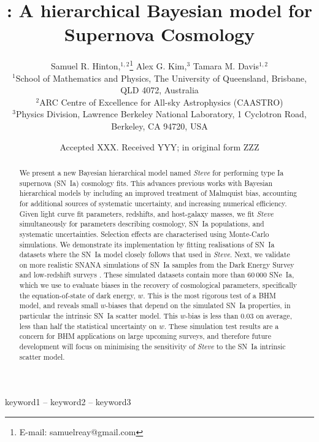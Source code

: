 \documentclass[a4paper,fleqn,usenatbib]{mnras}
\title[\name]{\name: A hierarchical Bayesian model for Supernova Cosmology}
\author[S. R. Hinton et al.]{
	Samuel R. Hinton,$^{1,2}$\thanks{E-mail: samuelreay@gmail.com}
	Alex G. Kim,$^{3}$
	Tamara M. Davis$^{1,2}$
	\\
	$^{1}$School of Mathematics and Physics, The University of Queensland, Brisbane, QLD 4072, Australia\\
	$^{2}$ARC Centre of Excellence for All-sky Astrophysics (CAASTRO)\\
	$^{3}$Physics Division, Lawrence Berkeley National Laboratory, 1 Cyclotron Road, Berkeley, CA 94720, USA
}
\date{Accepted XXX. Received YYY; in original form ZZZ}
\newcommand{\green}{\color{forestgreen}}
\newcommand{\steve}{\textit{Steve}}
\begin{document}
\label{firstpage}
\pagerange{\pageref{firstpage}--\pageref{lastpage}}
\maketitle






\begin{abstract}
We present a new Bayesian hierarchical model named {\steve} for performing type Ia supernova (SN~Ia) cosmology fits. 
%
This advances previous works with Bayesian hierarchical models by including 
an improved treatment of Malmquist bias, 
accounting for additional sources of systematic uncertainty, 
and increasing numerical efficiency. 
%
Given light curve fit parameters, redshifts, and host-galaxy masses, {\green we fit {\steve}} simultaneously for parameters describing cosmology, SN~Ia populations, and systematic uncertainties. Selection effects are characterised using Monte-Carlo simulations.
%
We demonstrate its implementation by fitting realisations of SN~Ia datasets where the SN~Ia model closely follows that used in {\steve}.
%
Next, we validate on more realistic SNANA simulations of SN~Ia samples from the Dark Energy Survey and low-redshift surveys \citep{DESKEY}.
%
These simulated datasets contain more than $60\,000$ SNe~Ia, which we use to evaluate biases in the recovery of cosmological parameters, specifically the equation-of-state of dark energy, $w$. 
%
This is the most rigorous test of a BHM model, and reveals small $w$-biases that depend on the simulated SN~Ia properties, in particular the intrinsic SN~Ia scatter model. This $w$-bias is less than $0.03$ on average, less than half the statistical uncertainty on $w$.
%
These simulation test results are a concern {\green for BHM applications on large upcoming surveys}, and therefore future development will focus on minimising the sensitivity of {\steve} to the SN~Ia intrinsic scatter model.
\end{abstract}

\begin{keywords}
keyword1 -- keyword2 -- keyword3
\end{keywords}
\end{document}
